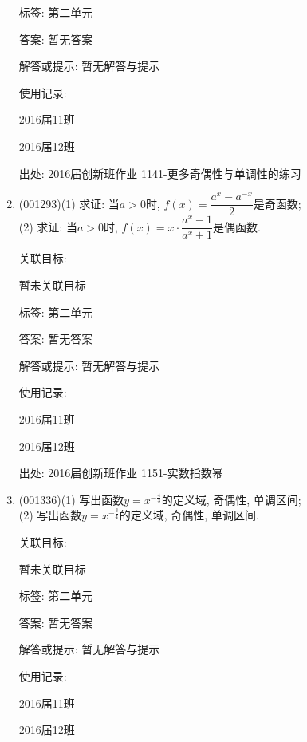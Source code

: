 \documentclass[10pt,a4paper]{article}
\begin{document}
\begin{enumerate}[1.]
标签: 第二单元

答案: 暂无答案

解答或提示: 暂无解答与提示

使用记录:

2016届11班				

2016届12班				


出处: 2016届创新班作业	1141-更多奇偶性与单调性的练习
\item { (001293)}(1) 求证: 当$a>0$时, $f(x)=\dfrac{a^x-a^{-x}}{2}$是奇函数;\\ 
(2) 求证: 当$a>0$时, $f(x)=x\cdot \dfrac{a^x-1}{a^x+1}$是偶函数.


关联目标:

暂未关联目标



标签: 第二单元

答案: 暂无答案

解答或提示: 暂无解答与提示

使用记录:

2016届11班		

2016届12班		


出处: 2016届创新班作业	1151-实数指数幂
\item { (001336)}(1) 写出函数$y=x^{-\frac{4}{3}}$的定义域, 奇偶性, 单调区间;\\ 
(2) 写出函数$y=x^{-\frac{3}{4}}$的定义域, 奇偶性, 单调区间.


关联目标:

暂未关联目标



标签: 第二单元

答案: 暂无答案

解答或提示: 暂无解答与提示

使用记录:

2016届11班		

2016届12班		



\end{enumerate}
\end{document}
